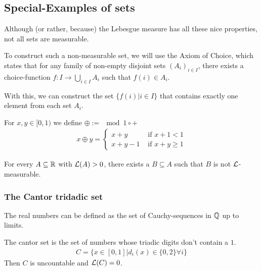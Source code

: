 \subsection{Special-Examples of sets}
Although (or rather, because) the Lebesgue measure has all these nice properties, not all sets are measurable.

To construct such a non-measurable set, we will use the Axiom of Choice, which states that for any family of non-empty disjoint sets $(A_i)_{i \in I}$, there exists a choice-function $f: I \to \bigcup_{i \in I} A_i$ such that $f(i) \in A_i$.

With this, we can construct the set $\{f(i) \big\vert i \in I\}$ that contains exactly one element from each set $A_i$.

For $x,y \in [0,1)$ we define $\oplus := \mod 1 \circ +$
\begin{align*}
  x \oplus y = \left\{\begin{array}{ll}
    x+y & \text{ if } x + 1 < 1\\
    x + y - 1 & \text{ if } x + y \geq 1
  \end{array} \right.
\end{align*}


\begin{ex}[]
  For every $A \subseteq \mathbb{R}$ with $\mathcal{L}(A) > 0$, there exists a $B \subseteq A$ such that $B$ is not $\mathcal{L}$-measurable.
\end{ex}

\subsubsection*{The Cantor tridadic set}

The real numbers can be defined as the set of Cauchy-sequences in $\mathbb{Q}$ up to limits.

The cantor set is the set of numbers whose triadic digits don't contain a $1$.
\begin{align*}
  C = \{x \in [0,1] \big\vert d_i(x) \in \{0,2\} \forall i\}
\end{align*}
Then $C$ is uncountable and $\mathcal{L}(C) = 0$.


